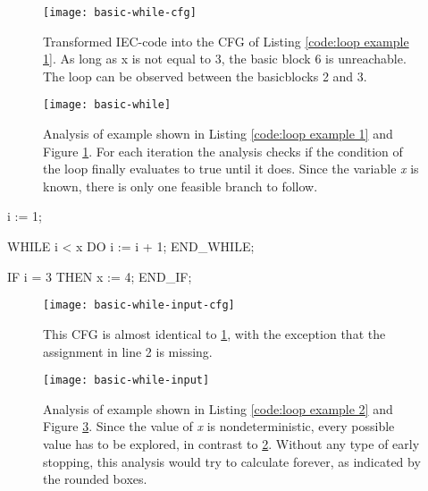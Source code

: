 \begin{figure}[h!]
	\centering
	\texttt{[image: basic-while-cfg]}
	\caption{Transformed IEC-code into the CFG of Listing \ref{code:loop example 1}. As long as x is not equal to 3, the basic block 6 is unreachable. The loop can be observed between the basicblocks 2 and 3.}
	\label{fig:loop example 1 cfg}
\end{figure}
\begin{figure}[h!]
	\centering
	\texttt{[image: basic-while]}
	\caption{Analysis of example shown in Listing \ref{code:loop example 1} and Figure \ref{fig:loop example 1 cfg}. For each iteration the analysis checks if the condition of the loop finally evaluates to true until it does. Since the variable \emph{x} is known, there is only one feasible branch to follow.}
	\label{fig:loop example 1}
\end{figure}

\begin{program}[h!]
	\begin{GenericCode}
i := 1;
	
WHILE i < x DO
	i := i + 1;
END_WHILE;
	
IF i = 3 THEN
	x := 4;
END_IF;		\end{GenericCode}

\centering
\caption{Same as \ref{code:loop example 1}, but x is an input variable. Therefore it may be 3, so it could be reachable.}
\label{code:loop example 2}
\end{program}
\begin{figure}[h!]
	\centering
	\texttt{[image: basic-while-input-cfg]}
	\caption{This CFG is almost identical to \ref{fig:loop example 1 cfg}, with the exception that the assignment in line 2 is missing.}
	\label{fig:loop example 2 cfg}
\end{figure}
\begin{figure}[h!]
	\centering
	\texttt{[image: basic-while-input]}
	\caption{Analysis of example shown in Listing \ref{code:loop example 2} and Figure \ref{fig:loop example 2 cfg}. Since the value of \emph{x} is nondeterministic, every possible value has to be explored, in contrast to \ref{fig:loop example 1}. Without any type of early stopping, this analysis would try to calculate forever, as indicated by the rounded boxes. }
	\label{fig:loop example 2}
\end{figure}
